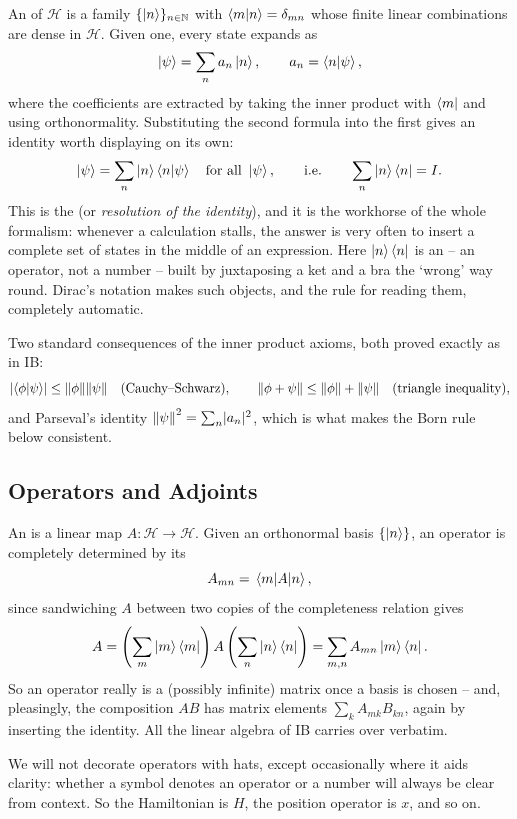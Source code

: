 \documentclass[a4paper]{scrartcl}
\begin{document}
An  of $\mathcal{H}$ is a family $\{\ket{n}\}_{n \in \mathbb{N}}$ with $\braket{m}{n} = \delta_{mn}$ whose finite linear combinations are dense in $\mathcal{H}$. Given one, every state expands as
$$
\ket{\psi} = \sum_n a_n \ket{n}, \qquad a_n = \braket{n}{\psi},
$$
where the coefficients are extracted by taking the inner product with $\bra{m}$ and using orthonormality. Substituting the second formula into the first gives an identity worth displaying on its own:
$$
\ket{\psi} = \sum_n \ket{n} \braket{n}{\psi} \quad \text{for all } \ket{\psi}, \qquad \text{i.e.} \qquad \sum_n \ket{n}\bra{n} = I.
$$
This is the  (or \emph{resolution of the identity}), and it is the workhorse of the whole formalism: whenever a calculation stalls, the answer is very often to insert a complete set of states in the middle of an expression. Here $\ket{n}\bra{n}$ is an  -- an operator, not a number -- built by juxtaposing a ket and a bra the `wrong' way round. Dirac's notation makes such objects, and the rule for reading them, completely automatic.

Two standard consequences of the inner product axioms, both proved exactly as in IB:
$$
\lvert\braket{\phi}{\psi}\rvert \leq \norm{\phi}\norm{\psi} \quad \text{(Cauchy--Schwarz)}, \qquad
\norm{\phi + \psi} \leq \norm{\phi} + \norm{\psi} \quad \text{(triangle inequality)},
$$
and Parseval's identity $\norm{\psi}^2 = \sum_n \lvert a_n\rvert^2$, which is what makes the Born rule below consistent.

\subsection{Operators and Adjoints}

An  is a linear map $A : \mathcal{H} \to \mathcal{H}$. Given an orthonormal basis $\{\ket{n}\}$, an operator is completely determined by its 
$$
A_{mn} = \mel{m}{A}{n},
$$
since sandwiching $A$ between two copies of the completeness relation gives
$$
A = \left(\sum_m \ket{m}\bra{m}\right) A \left(\sum_n \ket{n}\bra{n}\right) = \sum_{m,n} A_{mn} \ket{m}\bra{n}.
$$
So an operator really is a (possibly infinite) matrix once a basis is chosen -- and, pleasingly, the composition $AB$ has matrix elements $\sum_k A_{mk}B_{kn}$, again by inserting the identity. All the linear algebra of IB carries over verbatim.

\begin{notation}
    We will not decorate operators with hats, except occasionally where it aids clarity: whether a symbol denotes an operator or a number will always be clear from context. So the Hamiltonian is $H$, the position operator is $x$, and so on.
\end{notation}
\end{document}
